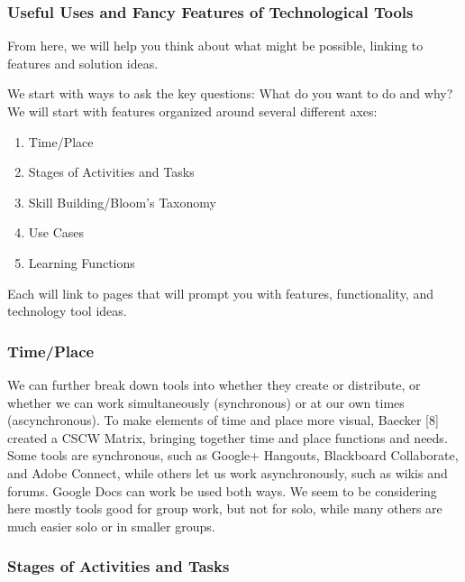 \hypertarget{useful-uses-and-fancy-features-of-technological-tools}{%
\subsubsection{Useful Uses and Fancy Features of Technological
Tools}\label{useful-uses-and-fancy-features-of-technological-tools}}

From here, we will help you think about what might be possible, linking
to features and solution ideas.

We start with ways to ask the key questions: What do you want to do and
why? We will start with features organized around several different
axes:

\begin{enumerate}
\def\labelenumi{\arabic{enumi}.}
\tightlist
\item
  Time/Place
\item
  Stages of Activities and Tasks
\item
  Skill Building/Bloom's Taxonomy
\item
  Use Cases
\item
  Learning Functions
\end{enumerate}

Each will link to pages that will prompt you with features,
functionality, and technology tool ideas.

\hypertarget{timeplace}{%
\subsubsection{Time/Place}\label{timeplace}}

We can further break down tools into whether they create or distribute,
or whether we can work simultaneously (synchronous) or at our own times
(ascynchronous). To make elements of time and place more visual, Baecker
{{[}8{]}} created a CSCW Matrix, bringing together time and place
functions and needs. Some tools are synchronous, such as Google+
Hangouts, Blackboard Collaborate, and Adobe Connect, while others let us
work asynchronously, such as wikis and forums. Google Docs can work be
used both ways. We seem to be considering here mostly tools good for
group work, but not for solo, while many others are much easier solo or
in smaller groups.

\hypertarget{stages-of-activities-and-tasks}{%
\subsubsection{Stages of Activities and
Tasks}\label{stages-of-activities-and-tasks}}

